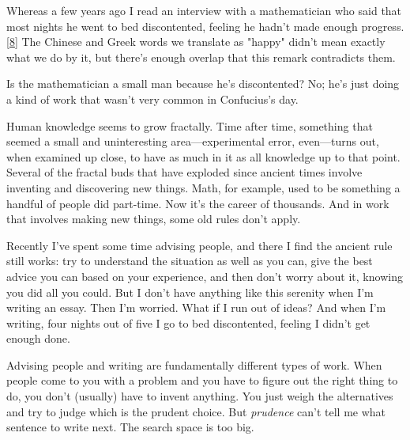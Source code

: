 Whereas a few years ago I read an interview with
                  a mathematician who said that most nights he went to bed
                  discontented, feeling he hadn't made enough progress.
                  [\href{\#f8n}{8}]
                  The Chinese and Greek words we translate as "happy" didn't
                  mean exactly what we do by it, but there's enough overlap that
                  this remark contradicts them.

Is the mathematician
                  a small man because he's discontented? No; he's just doing a
                  kind of work that wasn't very common in Confucius's day.

Human
                  knowledge seems to grow fractally. Time after time, something
                  that seemed a small and uninteresting area---experimental
                  error, even---turns out, when examined up close, to have
                  as much in it as all knowledge up to that point. Several of
                  the fractal buds that have exploded since ancient times
                  involve inventing and discovering new things. Math, for
                  example, used to be something a handful of people did
                  part-time. Now it's the career of thousands. And in work that
                  involves making new things, some old rules don't apply.

Recently
                  I've spent some time advising people, and there I find the
                  ancient rule still works: try to understand the situation as
                  well as you can, give the best advice you can based on your
                  experience, and then don't worry about it, knowing you did all
                  you could. But I don't have anything like this serenity when
                  I'm writing an essay. Then I'm worried. What if I run out of
                  ideas? And when I'm writing, four nights out of five I go to
                  bed discontented, feeling I didn't get enough done.

Advising
                  people and writing are fundamentally different types of work.
                  When people come to you with a problem and you have to figure
                  out the right thing to do, you don't (usually) have to invent
                  anything. You just weigh the alternatives and try to judge
                  which is the prudent choice. But \emph{prudence} can't tell me
                  what sentence to write next. The search space is too big.

